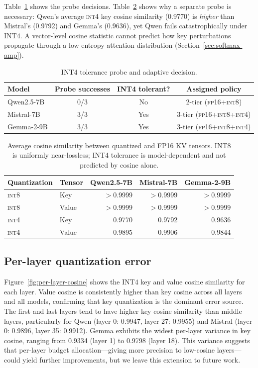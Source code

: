 \documentclass[11pt]{article}
\newcommand{\fp}{\textsc{fp16}}
\newcommand{\intviii}{\textsc{int8}}
\newcommand{\intiv}{\textsc{int4}}
\theoremstyle{plain}
\theoremstyle{definition}
\begin{document}
Table~\ref{tab:probe} shows the probe decisions.  Table~\ref{tab:cosine} shows why a separate probe is necessary: Qwen's average \intiv{} key cosine similarity (0.9770) is \emph{higher} than Mistral's (0.9792) and Gemma's (0.9636), yet Qwen fails catastrophically under INT4.  A vector-level cosine statistic cannot predict how key perturbations propagate through a low-entropy attention distribution (Section~\ref{sec:softmax-amp}).

\begin{table}[t]
\centering
\caption{INT4 tolerance probe and adaptive decision.}
\label{tab:probe}
\small
\begin{tabular}{lccc}
\toprule
Model & Probe successes & INT4 tolerant? & Assigned policy \\
\midrule
Qwen2.5-7B & 0/3 & No & 2-tier (\fp{}+\intviii{}) \\
Mistral-7B & 3/3 & Yes & 3-tier (\fp{}+\intviii{}+\intiv{}) \\
Gemma-2-9B & 3/3 & Yes & 3-tier (\fp{}+\intviii{}+\intiv{}) \\
\bottomrule
\end{tabular}
\end{table}

\begin{table}[t]
\centering
\caption{Average cosine similarity between quantized and FP16 KV tensors.  INT8 is uniformly near-lossless; INT4 tolerance is model-dependent and not predicted by cosine alone.}
\label{tab:cosine}
\small
\begin{tabular}{llrrr}
\toprule
Quantization & Tensor & Qwen2.5-7B & Mistral-7B & Gemma-2-9B \\
\midrule
\intviii{} & Key & $>$0.9999 & $>$0.9999 & $>$0.9999 \\
\intviii{} & Value & $>$0.9999 & $>$0.9999 & $>$0.9999 \\
\intiv{} & Key & 0.9770 & 0.9792 & 0.9636 \\
\intiv{} & Value & 0.9895 & 0.9906 & 0.9844 \\
\bottomrule
\end{tabular}
\end{table}

\subsection{Per-layer quantization error}
\label{sec:per-layer-quant}

Figure~\ref{fig:per-layer-cosine} shows the INT4 key and value cosine similarity for each layer.  Value cosine is consistently higher than key cosine across all layers and all models, confirming that key quantization is the dominant error source.  The first and last layers tend to have higher key cosine similarity than middle layers, particularly for Qwen (layer 0: 0.9947, layer 27: 0.9955) and Mistral (layer 0: 0.9896, layer 35: 0.9912).  Gemma exhibits the widest per-layer variance in key cosine, ranging from 0.9334 (layer 1) to 0.9798 (layer 18).  This variance suggests that per-layer budget allocation---giving more precision to low-cosine layers---could yield further improvements, but we leave this extension to future work.
\end{document}
